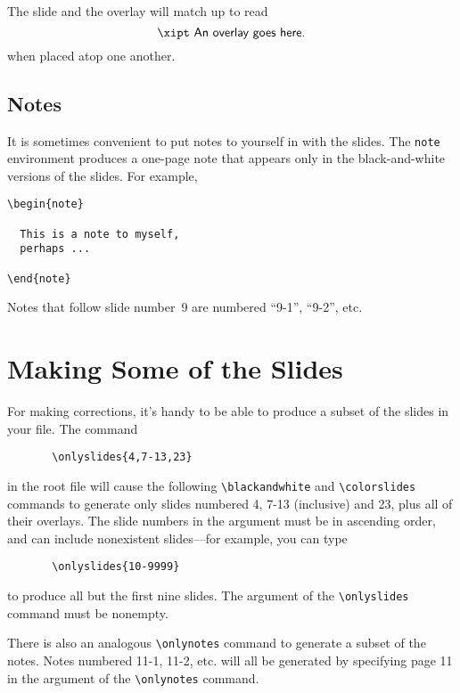 The slide and the overlay will match up to read
\[ \mbox{\xipt \sf An overlay goes here.} \]
when placed atop one another.

\subsection{Notes}

It is sometimes convenient to put notes to yourself in with the
slides.	 The \mbox{\tt note} environment
produces a one-page note that appears only in the black-and-white
versions of the slides.	 For example,
\begin{exambox}
\midbox
\begin{verbatim}
\begin{note}

  This is a note to myself,
  perhaps ...

\end{note}
\end{verbatim}
\end{exambox}

\noindent
Notes that follow slide number~9 are numbered
``9-1'', ``9-2'', etc.


\section{Making Some of the Slides}

For making corrections, it's handy to be able to produce a subset of
the slides in your file.  The command
\begin{verbatim}
       \onlyslides{4,7-13,23}
\end{verbatim}
in the root file will cause the following
\xsp{}\hbox{\verb"\blackandwhite"}\xsp{} and
\xsp{}\hbox{\verb"\colorslides"}\xsp{} commands to generate only
slides numbered 4, 7-13 (inclusive) and 23, plus all of their
overlays.  The slide numbers in the argument must be in ascending
order, and can include nonexistent slides---for example, you can type
\begin{verbatim}
       \onlyslides{10-9999}
\end{verbatim}
to produce all but the first nine slides.  The argument of the
\xsp{}\hbox{\verb"\onlyslides"}\xsp{} command must be nonempty.

There is also an analogous
\xsp{}\hbox{\verb"\onlynotes"}\xsp{} command to
generate a subset of the notes.	 Notes numbered 11-1, 11-2, etc. will
all be generated by specifying page 11 in the argument of the
\xsp{}\hbox{\verb"\onlynotes"}\xsp{} command.

